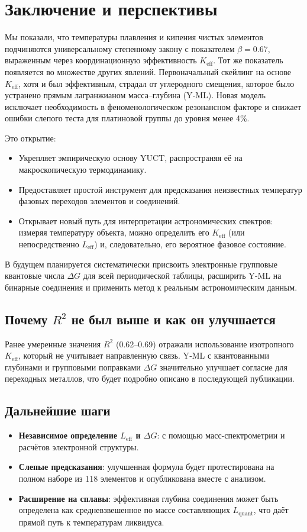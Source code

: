 \documentclass[12pt,a4paper]{article}
\theoremstyle{remark}
\newcommand{\Keff}{K_{\mathrm{eff}}}
\newcommand{\be}{\beta}               %
\begin{document}
	\section{Заключение и перспективы}
	Мы показали, что температуры плавления и кипения чистых элементов подчиняются универсальному степенному закону с показателем \(\be = 0.67\), выраженным через координационную эффективность \(\Keff\). Тот же показатель появляется во множестве других явлений. Первоначальный скейлинг на основе \(K_{\mathrm{eff}}\), хотя и был эффективным, страдал от углеродного смещения, которое было устранено прямым лагранжианом масса–глубина (Y‑ML). Новая модель исключает необходимость в феноменологическом резонансном факторе и снижает ошибки слепого теста для платиновой группы до уровня менее 4\%.
	
	Это открытие:
	\begin{itemize}
		\item Укрепляет эмпирическую основу YUCT, распространяя её на макроскопическую термодинамику.
		\item Предоставляет простой инструмент для предсказания неизвестных температур фазовых переходов элементов и соединений.
		\item Открывает новый путь для интерпретации астрономических спектров: измеряя температуру объекта, можно определить его \(\Keff\) (или непосредственно \(L_{\mathrm{eff}}\)) и, следовательно, его вероятное фазовое состояние.
	\end{itemize}
	В будущем планируется систематически присвоить электронные групповые квантовые числа \(\Delta G\) для всей периодической таблицы, расширить Y‑ML на бинарные соединения и применить метод к реальным астрономическим данным.
	
	\subsection{Почему \(R^2\) не был выше и как он улучшается}
	Ранее умеренные значения \(R^2\) (0.62–0.69) отражали использование изотропного \(K_{\mathrm{eff}}\), который не учитывает направленную связь. Y‑ML с квантованными глубинами и групповыми поправками \(\Delta G\) значительно улучшает согласие для переходных металлов, что будет подробно описано в последующей публикации.
	
	\subsection{Дальнейшие шаги}
	\begin{itemize}
		\item \textbf{Независимое определение \(L_{\mathrm{eff}}\) и \(\Delta G\)}: с помощью масс-спектрометрии и расчётов электронной структуры.
		\item \textbf{Слепые предсказания}: улучшенная формула будет протестирована на полном наборе из 118 элементов и опубликована вместе с анализом.
		\item \textbf{Расширение на сплавы}: эффективная глубина соединения может быть определена как средневзвешенное по массе составляющих \(L_{\mathrm{quant}}\), что даёт прямой путь к температурам ликвидуса.
	\end{itemize}
	
\end{document}
